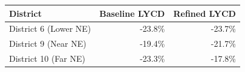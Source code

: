 \begin{tabularx}{\linewidth}{@{} Xrr @{}}
\toprule
District & Baseline LYCD & Refined LYCD \\
\midrule
District 6 (Lower NE) & -23.8\% & -23.7\% \\
District 9 (Near NE) & -19.4\% & -21.7\% \\
District 10 (Far NE) & -23.3\% & -17.8\% \\
\bottomrule
\end{tabularx}
